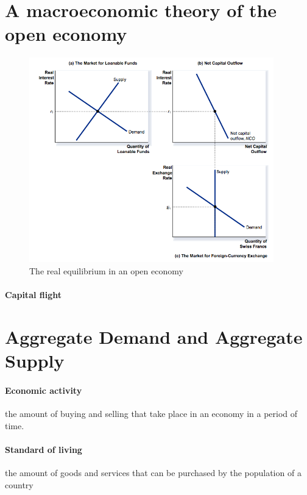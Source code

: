 \documentclass[a4paper,titlepage] {scrartcl}
\begin{document}
\section{A macroeconomic theory of the open economy}
\begin{figure}[htbp]
	\centering
		\includegraphics[height=3.5in]{images/realeqinopeneco.png}
	\caption{The real equilibrium in an open economy}
	\label{fig:images_realeqinopeneco}
\end{figure}

\paragraph{Capital flight} %
\label{par:capital_flight}


\section{Aggregate Demand and Aggregate Supply}

\paragraph{Economic activity} %
\label{par:economic_activity}
the amount of buying and selling	that take place in an economy in a period of time.

\paragraph{Standard of living} %
\label{par:standard_of_living}
the amount of goods and services that can be purchased by the population of a country
\end{document}

